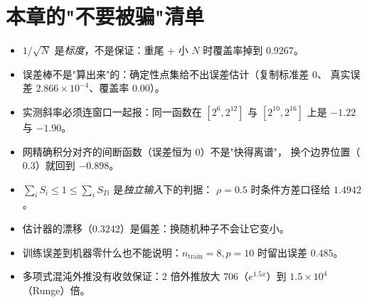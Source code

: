 \section{本章的"不要被骗"清单}

\begin{itemize}
  \item $1/\sqrt N$ 是\emph{标度}，不是保证：重尾 + 小 $N$ 时覆盖率掉到 $0.9267$。
  \item 误差棒不是"算出来"的：确定性点集给不出误差估计（复制标准差 $0$、
        真实误差 $2.866\times10^{-4}$、覆盖率 $0.00$）。
  \item 实测斜率必须连窗口一起报：同一函数在 $[2^6,2^{12}]$ 与 $[2^{10},2^{16}]$
        上是 $-1.22$ 与 $-1.90$。
  \item 网精确积分对齐的间断函数（误差恒为 $0$）不是"快得离谱"，
        换个边界位置（$0.3$）就回到 $-0.898$。
  \item $\sum_iS_i\le1\le\sum_iS_{Ti}$ 是\emph{独立输入}下的判据：
        $\rho=0.5$ 时条件方差口径给 $1.4942$。
  \item 估计器的漂移（$0.3242$）是偏差：换随机种子不会让它变小。
  \item 训练误差到机器零什么也不能说明：$n_{\text{train}}=8,p=10$ 时留出误差 $0.485$。
  \item 多项式混沌外推没有收敛保证：2 倍外推放大 $706$（$e^{1.5x}$）到
        $1.5\times10^4$（Runge）倍。
\end{itemize}


